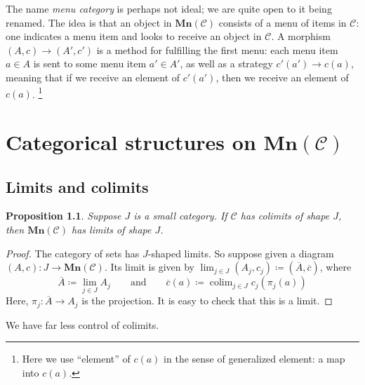 \documentclass[11pt, one side, article]{memoir}
\theoremstyle{definition}
\theoremstyle{plain}
\newtheorem{proposition}[definitionx]{Proposition}
\DeclareMathOperator*{\colim}{colim}
\newcommand{\cat}[1]{\mathcal{#1}}%
\newcommand{\Cat}[1]{\mathbf{#1}}%
\newcommand{\ol}[1]{\overline{#1}}
\newcommand{\0}{\textsf{0}}
\newcommand{\1}{\tn{\textsf{1}}}
\newcommand{\2}{\tn{\textsf{2}}}
\newcommand{\3}{\tn{\textsf{3}}}
\newcommand{\4}{\tn{\textsf{4}}}
\newcommand{\5}{\tn{\textsf{5}}}
\newcommand{\6}{\tn{\textsf{6}}}
\newcommand{\7}{\tn{\textsf{7}}}
\newcommand{\8}{\tn{\textsf{8}}}
\newcommand{\9}{\tn{\textsf{9}}}
\newcommand{\mn}{\Cat{Mn}}
\newcommand{\qqand}{\qquad\text{and}\qquad}
\begin{document}
The name \emph{menu category} is perhaps not ideal; we are quite open to it being renamed. The idea is that an object in $\mn(\cat{C})$ consists of a menu of items in $\cat{C}$: one indicates a menu item and looks to receive an object in $\cat{C}$. A morphism $(A,c)\to (A',c')$ is a method for fulfilling the first menu: each menu item $a\in A$ is sent to some menu item $a'\in A'$, as well as a strategy $c'(a')\to c(a)$, meaning that if we receive an element of $c'(a')$, then we receive an element of $c(a)$.%
\footnote{Here we use ``element'' of $c(a)$ in the sense of generalized element: a map into $c(a)$.}






\chapter{Categorical structures on $\mn(\cat{C})$}

\section{Limits and colimits}

\begin{proposition}\label{prop.colimits_to_limits}
Suppose $J$ is a small category. If $\cat{C}$ has colimits of shape $J$, then $\mn(\cat{C})$ has limits of shape $J$.
\end{proposition}
\begin{proof}
	The category of sets has $J$-shaped limits. So suppose given a diagram $(A,c)\colon J\to \mn(\cat{C})$. Its limit is given by $\lim_{j\in J}(A_j,c_j)\coloneqq(\ol{A},\ol{c})$, where
	\[
	\ol{A}\coloneqq\lim_{j\in J}A_j
	\qqand
	\ol{c}(a)\coloneqq\colim_{j\in J}c_j(\pi_j(a))
	\]
	Here, $\pi_j\colon \ol{A}\to A_j$ is the projection. It is easy to check that this is a limit.
\end{proof}

We have far less control of colimits.
\end{document}
